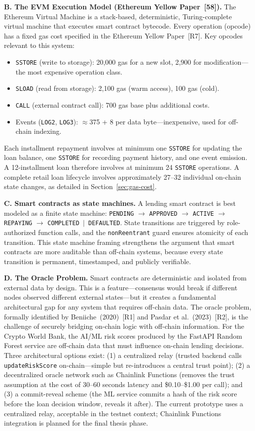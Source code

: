 \documentclass[12pt,a4paper]{report}
\begin{document}
\textbf{B. The EVM Execution Model (Ethereum Yellow Paper~[58]).}
The Ethereum Virtual Machine is a stack-based, deterministic, Turing-complete virtual machine that executes smart contract bytecode. Every operation (opcode) has a fixed gas cost specified in the Ethereum Yellow Paper~[R7]. Key opcodes relevant to this system:
\begin{itemize}[noitemsep]
  \item \texttt{SSTORE} (write to storage): 20,000 gas for a new slot, 2,900 for modification---the most expensive operation class.
  \item \texttt{SLOAD} (read from storage): 2,100 gas (warm access), 100 gas (cold).
  \item \texttt{CALL} (external contract call): 700 gas base plus additional costs.
  \item Events (\texttt{LOG2}, \texttt{LOG3}): $\approx$375 + 8 per data byte---inexpensive, used for off-chain indexing.
\end{itemize}
Each installment repayment involves at minimum one \texttt{SSTORE} for updating the loan balance, one \texttt{SSTORE} for recording payment history, and one event emission. A 12-installment loan therefore involves at minimum 24 \texttt{SSTORE} operations. A complete retail loan lifecycle involves approximately 27--32 individual on-chain state changes, as detailed in Section~\ref{sec:gas-cost}.

\textbf{C. Smart contracts as state machines.}
A lending smart contract is best modeled as a finite state machine: \texttt{PENDING} $\to$ \texttt{APPROVED} $\to$ \texttt{ACTIVE} $\to$ \texttt{REPAYING} $\to$ \texttt{COMPLETED $|$ DEFAULTED}. State transitions are triggered by role-authorized function calls, and the \texttt{nonReentrant} guard ensures atomicity of each transition. This state machine framing strengthens the argument that smart contracts are more auditable than off-chain systems, because every state transition is permanent, timestamped, and publicly verifiable.

\textbf{D. The Oracle Problem.}
Smart contracts are deterministic and isolated from external data by design. This is a feature---consensus would break if different nodes observed different external states---but it creates a fundamental architectural gap for any system that requires off-chain data. The oracle problem, formally identified by Beniiche~(2020)~[R1] and Pasdar et al.~(2023)~[R2], is the challenge of securely bridging on-chain logic with off-chain information. For the Crypto World Bank, the AI/ML risk scores produced by the FastAPI Random Forest service are off-chain data that must influence on-chain lending decisions. Three architectural options exist: (1) a centralized relay (trusted backend calls \texttt{updateRiskScore} on-chain---simple but re-introduces a central trust point); (2) a decentralized oracle network such as Chainlink Functions (removes the trust assumption at the cost of 30--60 seconds latency and \$0.10--\$1.00 per call); and (3) a commit-reveal scheme (the ML service commits a hash of the risk score before the loan decision window, reveals it after). The current prototype uses a centralized relay, acceptable in the testnet context; Chainlink Functions integration is planned for the final thesis phase.
\end{document}
